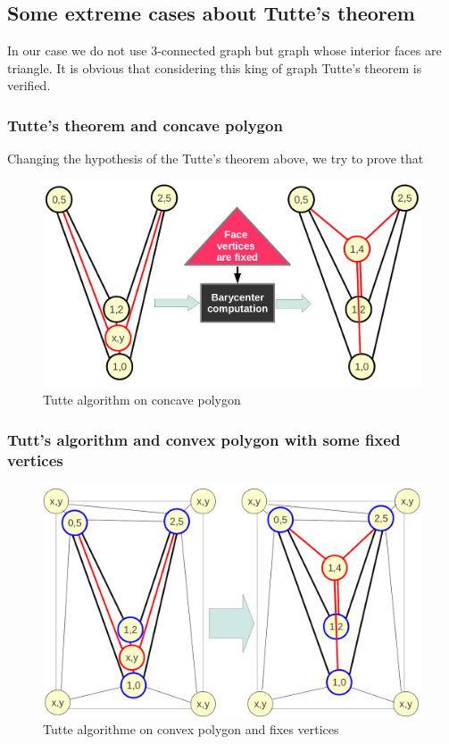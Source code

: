 \subsection{Some extreme cases about Tutte's theorem}
In our case we do not use 3-connected graph but graph whose interior faces are triangle. It is obvious that considering this king of graph Tutte's theorem is verified.
\subsubsection{Tutte's theorem and concave polygon}
Changing the hypothesis of the Tutte's theorem above, we try to prove that 

\begin {figure}[H]
  \centering
  \includegraphics[scale=0.5]{img/tutte2.png}
  \caption{Tutte algorithm on concave polygon}
  \label{struct3}
\end {figure}

\subsubsection{Tutt's algorithm and convex polygon with some fixed vertices}


\begin {figure}[H]
  \centering
  \includegraphics[scale=0.5]{img/tutte3.png}
  \caption{Tutte algorithme on convex polygon and fixes vertices}
  \label{struct3}
\end {figure}
